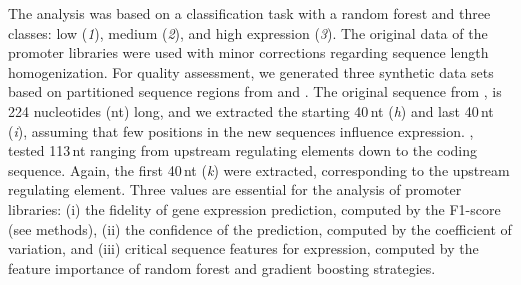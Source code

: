 \documentclass[utf8]{frontiersSCNS} %
\begin{document}
The analysis was based on a classification task with a random forest and three classes: low (\textit{1}), medium (\textit{2}), and high expression (\textit{3}). The original data of the promoter libraries were used with minor corrections regarding sequence length homogenization. For quality assessment, we generated three synthetic data sets based on partitioned sequence regions from \cite{Meng2013} and \cite{Zhao2020}. The original sequence from \cite{Meng2013}, is 224 nucleotides (nt) long, and we extracted the starting 40\,nt (\textit{h}) and last 40\,nt (\textit{i}), assuming that few positions in the new sequences influence expression. \cite{Zhao2020}, tested 113\,nt ranging from upstream regulating elements down to the coding sequence. Again, the first 40\,nt (\textit{k}) were extracted, corresponding to the upstream regulating element. Three values are essential for the analysis of promoter libraries: (i) the fidelity of gene expression prediction, computed by the F1-score (see methods), (ii) the confidence of the prediction, computed by the coefficient of variation, and (iii) critical sequence features for expression, computed by the feature importance of random forest and gradient boosting strategies. 

\end{document}
